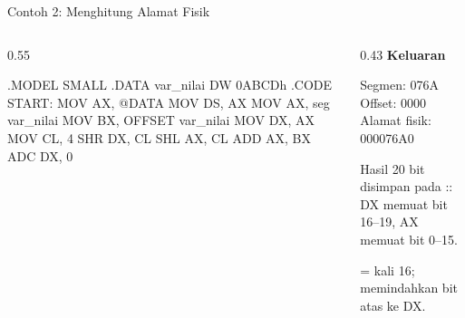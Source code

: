 \documentclass[aspectratio=169,11pt]{beamer}
\begin{document}
\begin{frame}[fragile]{Contoh 2: Menghitung Alamat Fisik}
\begin{columns}[t]
\begin{column}{0.55\textwidth}
\begin{kodeasm}
.MODEL SMALL
.DATA
    var_nilai DW 0ABCDh
.CODE
START:
    MOV AX, @DATA
    MOV DS, AX
    MOV AX, seg var_nilai
    MOV BX, OFFSET var_nilai
    MOV DX, AX
    MOV CL, 4
    SHR DX, CL
    SHL AX, CL
    ADD AX, BX
    ADC DX, 0
\end{kodeasm}
\end{column}
\begin{column}{0.43\textwidth}
\footnotesize
{\color{obeTeal}\bfseries Keluaran}\\[0.15em]
\begin{keluaran}
Segmen: 076A
Offset: 0000
Alamat fisik: 000076A0
\end{keluaran}

\vspace{0.3em}
Hasil 20 bit disimpan pada :: DX memuat bit
16--19, AX memuat bit 0--15.

\vspace{0.2em}
{\color{obeGray} = kali 16;  memindahkan bit
atas ke DX.\par}
\end{column}
\end{columns}
\end{frame}
\end{document}
